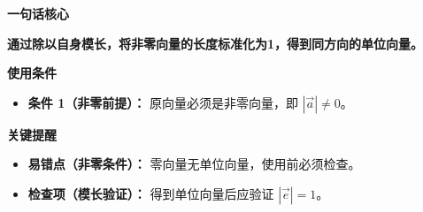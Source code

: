 \begin{summarybox}
	\textbf{\textcolor{CSummary}{一句话核心}}

	\textbf{通过除以自身模长，将非零向量的长度标准化为1，得到同方向的单位向量。}

	\medskip
	\textbf{\textcolor{CSummary}{使用条件}}
	\begin{itemize}[leftmargin=*, itemsep=0.5em, topsep=0.4em]
		\item \textbf{条件 1（非零前提）：} 原向量必须是非零向量，即 $|\vec{a}| \neq 0$。
	\end{itemize}

	\medskip
	\textbf{\textcolor{CSummary}{关键提醒}}
	\begin{itemize}[leftmargin=*, itemsep=0.5em, topsep=0.4em]
		\item \textbf{易错点（非零条件）：} 零向量无单位向量，使用前必须检查。
		\item \textbf{检查项（模长验证）：} 得到单位向量后应验证 $|\vec{e}|=1$。
	\end{itemize}
\end{summarybox}
